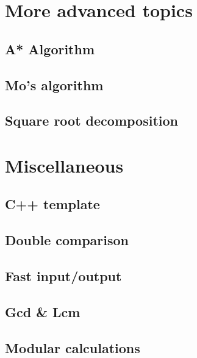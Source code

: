 \section{More advanced topics}
\subsection{A* Algorithm}
\raggedbottom
\hrulefill
\subsection{Mo's algorithm}
\raggedbottom
\hrulefill
\subsection{Square root decomposition}
\raggedbottom
\hrulefill


\section{Miscellaneous}
\subsection{C++ template}
\raggedbottom
\hrulefill
\subsection{Double comparison}
\raggedbottom
\hrulefill
\subsection{Fast input/output}
\raggedbottom
\hrulefill
\subsection{Gcd \& Lcm}
\raggedbottom
\hrulefill
\subsection{Modular calculations}
\raggedbottom
\hrulefill
